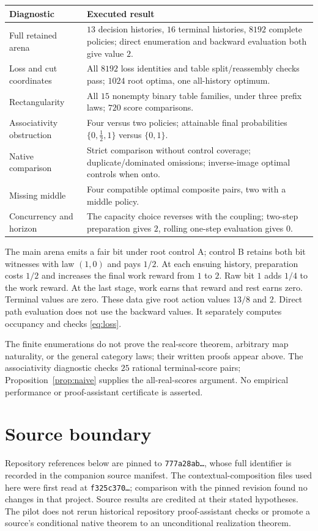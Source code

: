 \documentclass[11pt]{article}
\theoremstyle{definition}
\begin{document}
\begin{center}
\small
\begin{tabularx}{\textwidth}{@{}lX@{}}
\toprule
Diagnostic & Executed result\\
\midrule
Full retained arena & \(13\) decision histories, \(16\) terminal histories,
\(8192\) complete policies; direct enumeration and backward evaluation
both give value \(2\).\\
Loss and cut coordinates & All \(8192\) loss identities and table
split/reassembly checks pass; \(1024\) root optima, one all-history optimum.\\
Rectangularity & All \(15\) nonempty binary table families, under three
prefix laws; \(720\) score comparisons.\\
Associativity obstruction & Four versus two policies; attainable final
probabilities \(\{0,\tfrac12,1\}\) versus \(\{0,1\}\).\\
Native comparison & Strict comparison without control coverage;
duplicate/dominated omissions; inverse-image optimal controls when onto.\\
Missing middle & Four compatible optimal composite pairs, two with a
middle policy.\\
Concurrency and horizon & The capacity choice reverses with the coupling;
two-step preparation gives \(2\), rolling one-step evaluation gives \(0\).\\
\bottomrule
\end{tabularx}
\end{center}

The main arena emits a fair bit under root control A; control B retains
both bit witnesses with law \((1,0)\) and pays \(1/2\). At each ensuing
history, preparation costs \(1/2\) and increases the final work reward from
\(1\) to \(2\). Raw bit \(1\) adds \(1/4\) to the work reward. At the last
stage, work earns that reward and rest earns zero. Terminal values are
zero. These data give root action values \(13/8\) and \(2\).
Direct path evaluation does not use the backward values. It separately
computes occupancy and checks \eqref{eq:loss}.

The finite enumerations do not prove the real-score theorem, arbitrary
map naturality, or the general category laws; their written proofs appear
above. The associativity diagnostic checks \(25\) rational terminal-score
pairs; Proposition~\ref{prop:naive} supplies the all-real-scores argument.
No empirical performance or proof-assistant certificate is asserted.

\section{Source boundary}
Repository references below are pinned to
\texttt{777a28ab\ldots}, whose full identifier is recorded in the
companion source manifest. The contextual-composition files used here
were first read at \texttt{f325c370\ldots}; comparison with the pinned
revision found no changes in that project. Source results are credited
at their stated hypotheses. The pilot does not rerun historical repository
proof-assistant checks or promote a source's conditional native theorem
to an unconditional realization theorem.
\end{document}
